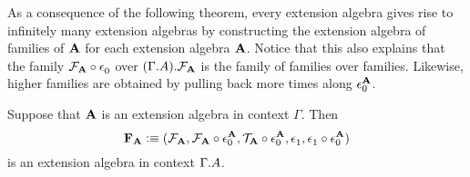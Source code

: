 As a consequence of the following theorem, every extension algebra gives rise
to infinitely many extension algebras by constructing the extension algebra
of families of $\cftalg{A}$ for each extension algebra $\cftalg{A}$. Notice
that this also explains that the family $\jcomp{}{\cftctxext}{\cftalgf{\cftalg{A}}}$
over $\ctxext{{\Gamma}{\cftalgc{\cftalg{A}}}}{\cftalgf{\cftalg{A}}}$ is the family
of families over families. Likewise, higher families are obtained by pulling
back more times along $\cftctxext[\cftalg{A}]$.

\begin{thm}\label{thm:extalg-fam}
Suppose that $\extalg{A}$ is an extension algebra in context
$\Gamma$. Then 
\begin{equation*}
\cftfamalg{\cftalg{A}}
\defeq
( \cftalgf{\cftalg{A}},
  \jcomp{}{\cftctxext[\cftalg{A}]}{\cftalgf{\cftalg{A}}},
  \jcomp{}{\cftctxext[\cftalg{A}]}{\cftalgt{\cftalg{A}}},
  \cftfamext,
  \jcomp{}{\cftctxext[\cftalg{A}]}{\cftfamext})
\end{equation*}
is an extension algebra in context $\ctxext{\Gamma}{\cftalgc{\cftalg{A}}}$.
\end{thm}

